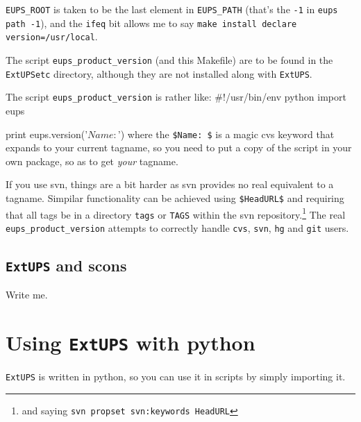 \documentclass{article}
\newcommand{\code}[1]{\texttt{#1}}
\newcommand{\eups}{\code{ExtUPS}\xspace}
\let\overbatim=\verbatim
\let\oendverbatim=\endverbatim
\renewenvironment{verbatim}
{\center\minipage{16cm}\overbatim}
{\oendverbatim\endminipage\endcenter}
\begin{document}
\code{EUPS\_ROOT} is taken to be the last element in \code{EUPS\_PATH} (that's
the \code{-1} in \code{eups path -1}),
and the \code{ifeq} bit allows me to say \code{make install declare version=/usr/local}.

The script \code{eups\_product\_version} (and this Makefile) are to be found
in the \eups \code{etc} directory, although they are not installed along
with \eups.

The script \code{eups\_product\_version} is rather like:
\begin{verbatim}
#!/usr/bin/env python
import eups

print eups.version('$Name: $')
\end{verbatim}
where the \code{\$Name:  \$} is a magic cvs keyword that expands to your
current tagname, so you need to put a copy of the script in your own
package, so as to get \emph{your} tagname.

If you use svn, things are a bit harder as svn provides no real
equivalent to a tagname. Simpilar functionality can be achieved using \code{\$HeadURL\$}
and requiring that all tags be in a directory \code{tags}
or \code{TAGS} within the svn repository.\footnote{
  and saying \code{svn propset svn:keywords HeadURL}}
The real \code{eups\_product\_version} attempts to correctly handle \code{cvs}, \code{svn},
\code{hg} and \code{git} users.

\subsection{\eups and scons}
\label{scons}

Write me.

\appendix

\section{Using \eups with python}

\eups is written in python, so you can use it in scripts by simply importing it.
\end{document}
